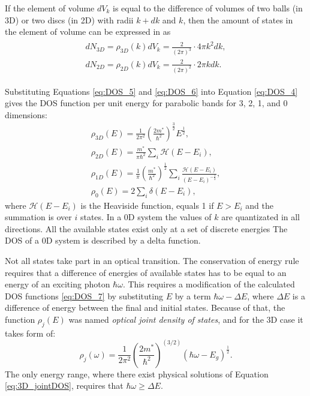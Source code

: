 \documentclass[titlepage,a4paper]{book}
\begin{document}
If the element of volume $dV_k$ is equal to the difference of volumes of two balls (in 3D) or two discs (in 2D) with radii $k+dk$ and $k$, then the amount of states in the element of volume can be expressed in as  
\begin{eqnarray}
\label{eq:DOS_6}
\begin{aligned}
dN_{3D} = \rho_{3D} (k) dV_k = \frac{2}{(2\pi)^3} \cdot 4\pi k^2 dk,\\
dN_{2D} = \rho_{2D} (k) dV_k = \frac{2}{(2\pi)^2} \cdot 2\pi k dk.
\end{aligned}
\end{eqnarray}

Substituting Equations \ref{eq:DOS_5} and \ref{eq:DOS_6} into Equation \ref{eq:DOS_4} gives the DOS function per unit energy for parabolic bands for 3, 2, 1, and 0 dimensions:
\begin{eqnarray}
\label{eq:DOS_7}
\rho_{3D}(E) = \frac{1}{2\pi^2} \left(\frac{2m^*}{\hbar^2} \right)^{\frac{3}{2}} E^\frac{1}{2}, \\
\rho_{2D}(E) = \frac{m^*}{\pi\hbar^2}\sum_i \mathcal{H}(E-E_i),\\
\rho_{1D}(E) = \frac{1}{\pi}\left(\frac{m^*}{\hbar^2}\right)^{\frac{1}{2}} \sum_i \frac{\mathcal{H}(E-E_i)}{(E-E_i)^{-\frac{1}{2}}} ,\\ 
\rho_{0}(E) = 2\sum_i \delta(E-E_i),
\end{eqnarray}
where $\mathcal{H}(E-E_i)$ is the Heaviside function, equals 1 if $E > E_i$ and the summation is over $i$ states. In a 0D system the values of $k$ are quantizated in all directions. All the available states exist only at a set of discrete energies The DOS of a 0D system is described by a delta function. 

Not all states take part in an optical transition. The conservation of energy rule requires that a difference of energies of available states has to be equal to an energy of an exciting photon $\hbar\omega$. This requires a modification of the calculated DOS functions \ref{eq:DOS_7} by substituting $E$ by a term $\hbar\omega-\Delta E$, where $\Delta E$ is a difference of energy between the final and initial states. Because of that, the function $\rho_j (E)$ was named \textit{optical joint density of states}, and for the 3D case it takes form of:
\begin{equation}
\label{eq:3D_jointDOS}
\rho_j (\omega) = \frac{1}{2\pi^2} \left(\frac{2m^*}{\hbar^2} \right)^{(3/2)} (\hbar\omega-E_g)^{\frac{1}{2}}.
\end{equation}
The only energy range, where there exist physical solutions of Equation \ref{eq:3D_jointDOS}, requires that $\hbar\omega \geq \Delta E$.
\end{document}
